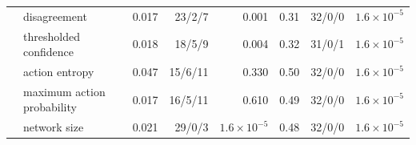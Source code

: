 \begin{table}[t]
\begin{tabular}{@{}llrrrrrr@{}}
 & disagreement & 0.017 & 23/2/7 & 0.001 & 0.31 & 32/0/0 & $1.6\times10^{-5}$ \\
 & thresholded confidence & 0.018 & 18/5/9 & 0.004 & 0.32 & 31/0/1 & $1.6\times10^{-5}$ \\
 & action entropy & 0.047 & 15/6/11 & 0.330 & 0.50 & 32/0/0 & $1.6\times10^{-5}$ \\
 & maximum action probability & 0.017 & 16/5/11 & 0.610 & 0.49 & 32/0/0 & $1.6\times10^{-5}$ \\
 & network size & 0.021 & 29/0/3 & $1.6\times10^{-5}$ & 0.48 & 32/0/0 & $1.6\times10^{-5}$ \\
\bottomrule
\end{tabular}
\end{table}
